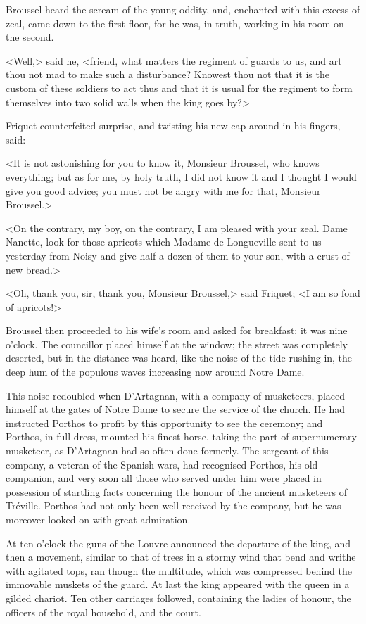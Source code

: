Broussel heard the scream of the young oddity, and, enchanted with this excess of zeal, came down to the first floor, for he was, in truth, working in his room on the second.

<Well,> said he, <friend, what matters the regiment of guards to us, and art thou not mad to make such a disturbance? Knowest thou not that it is the custom of these soldiers to act thus and that it is usual for the regiment to form themselves into two solid walls when the king goes by?>

Friquet counterfeited surprise, and twisting his new cap around in his fingers, said:

<It is not astonishing for you to know it, Monsieur Broussel, who knows everything; but as for me, by holy truth, I did not know it and I thought I would give you good advice; you must not be angry with me for that, Monsieur Broussel.>

<On the contrary, my boy, on the contrary, I am pleased with your zeal. Dame Nanette, look for those apricots which Madame de Longueville sent to us yesterday from Noisy and give half a dozen of them to your son, with a crust of new bread.>

<Oh, thank you, sir, thank you, Monsieur Broussel,> said Friquet; <I am so fond of apricots!>

Broussel then proceeded to his wife's room and asked for breakfast; it was nine o'clock. The councillor placed himself at the window; the street was completely deserted, but in the distance was heard, like the noise of the tide rushing in, the deep hum of the populous waves increasing now around Notre Dame.

This noise redoubled when D'Artagnan, with a company of musketeers, placed himself at the gates of Notre Dame to secure the service of the church. He had instructed Porthos to profit by this opportunity to see the ceremony; and Porthos, in full dress, mounted his finest horse, taking the part of supernumerary musketeer, as D'Artagnan had so often done formerly. The sergeant of this company, a veteran of the Spanish wars, had recognised Porthos, his old companion, and very soon all those who served under him were placed in possession of startling facts concerning the honour of the ancient musketeers of Tréville. Porthos had not only been well received by the company, but he was moreover looked on with great admiration.

At ten o'clock the guns of the Louvre announced the departure of the king, and then a movement, similar to that of trees in a stormy wind that bend and writhe with agitated tops, ran though the multitude, which was compressed behind the immovable muskets of the guard. At last the king appeared with the queen in a gilded chariot. Ten other carriages followed, containing the ladies of honour, the officers of the royal household, and the court.

